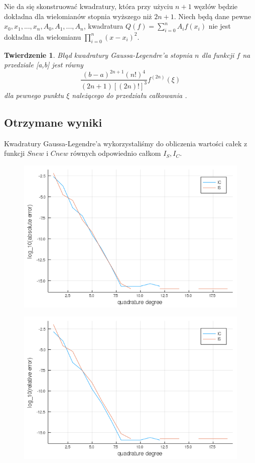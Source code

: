 \documentclass{article}
\newtheorem{theorem}{Twierdzenie}
\begin{document}
Nie da się skonstruować kwadratury, która przy użyciu $n+1$ węzłów będzie dokładna dla wielomianów stopnia wyższego niż $2n+1$. Niech będą dane pewne $x_0,x_1,...,x_n,A_0,A_1,...,A_n$, kwadratura $Q(f) = \sum_{i=0}^n A_if(x_i)$ nie jest dokładna dla wielomianu $\prod_{i=0}^n (x-x_i)^2$. \newline

\begin{theorem}
	Błąd kwadratury Gaussa-Legendre'a stopnia $n$ dla funkcji $f$ na przedziale [a,b] jest równy \[
		\frac{(b-a)^{2n+1}(n!)^4}{(2n+1)[(2n)!]^3}f^{(2n)}(\xi) \]
dla pewnego punktu $\xi$ należącego do przedziału całkowania \cite{khaner}.
\end{theorem}

\subsection{Otrzymane wyniki}
	Kwadratury Gaussa-Legendre'a wykorzystaliśmy do obliczenia wartości całek z funkcji $Snew$ i $Cnew$ równych odpowiednio całkom $I_S,I_C$.


\begin{figure}[ht]
    \includegraphics[scale=0.5]{WykresD1logabsolute.png}
    \label{wykresDabsolute}
\end{figure}
\begin{figure}[ht]
    \includegraphics[scale=0.5]{WykresD1logrelative.png}
    \label{wykresDrel}
\end{figure}
\end{document}
